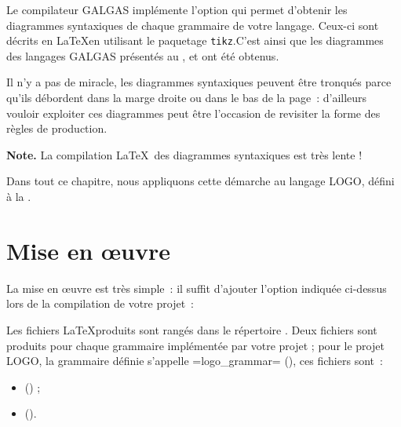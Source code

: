 

\tableDesMatieresDuChapitre


Le compilateur GALGAS implémente l'option  qui permet d'obtenir les diagrammes syntaxiques de chaque grammaire de votre langage. Ceux-ci sont décrits en \LaTeX en utilisant le paquetage \texttt{tikz}\label{tikz}.C'est ainsi que les diagrammes des langages GALGAS présentés au ,  et  ont été obtenus.

Il n'y a pas de miracle, les diagrammes syntaxiques peuvent être tronqués parce qu'ils débordent dans la marge droite ou dans le bas de la page~: d'ailleurs vouloir exploiter ces diagrammes peut être l'occasion de revisiter la forme des règles de production.

{\bf Note.} La compilation \LaTeX~des diagrammes syntaxiques est très lente !

Dans tout ce chapitre, nous appliquons cette démarche au langage LOGO, défini à la .

\section{Mise en œuvre}

La mise en œuvre est très simple~: il suffit d'ajouter l'option indiquée ci-dessus lors de la compilation de votre projet~:
\begin{description}
  \item[ ] 
\end{description}

Les fichiers \LaTeX produits sont rangés dans le répertoire . Deux fichiers sont produits pour chaque grammaire implémentée par votre projet ; pour le projet LOGO, la grammaire définie s'appelle \ggs=logo_grammar= (), ces fichiers sont~:
\begin{itemize}
\item {} () ;
\item {} ().
\end{itemize}


